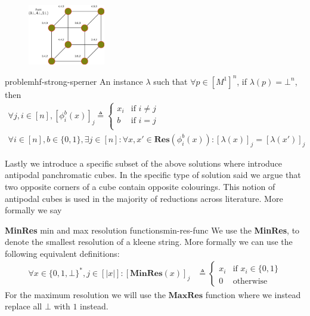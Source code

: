 \begin{figure}[h!]
    \centering
    \includegraphics[width=0.3\textwidth]{Chapter3/1753903956-dissertation-drawing-assets.pdf}
    \caption{}
    \label{fig:chap-3:res-hyper}
\end{figure}


\begin{definitionbox}{ problem}{hf-strong-sperner}
    An  instance $\lambda$ such that $\forall p \in [M^1]^n$, if $\lambda(p)= \bot^n$, then
    \begin{gather*}
        \forall j,i \in [n], [\phi^b_i(x)]_j \triangleq \begin{cases}
            x_i & \text{if }i \neq j \\
            b   & \text{if }i = j    \\
        \end{cases}\\
        \forall i \in [n],b \in\{0,1\},\exists j \in [n]: \forall x, x' \in \textbf{Res}(\phi^b_i(x)): [\lambda(x)]_j = [\lambda(x')]_j
    \end{gather*}
\end{definitionbox}

Lastly we introduce a specific subset of the above solutions where introduce antipodal panchromatic cubes.
In the specific type of solution said we argue that two opposite corners of a cube contain opposite colourings.
This notion of antipodal cubes is used in the majority of reductions across literature. More formally we say


\begin{definitionbox}{\textbf{MinRes} min and max resolution functions}{min-res-func}
    We use the \textbf{MinRes}, to denote the smallest resolution of a kleene string. More formally we can use the following equivalent definitions:
    \begin{align*}
        \forall x \in \{0,1,\bot\}^*, j \in [|x|]:  [\textbf{MinRes}(x)]_j
         & \triangleq \begin{cases}
                          x_i & \text{if } x_i \in \{0,1\} \\
                          0   & \text{otherwise}
                      \end{cases}
    \end{align*}
    For the maximum resolution we will use the $\textbf{MaxRes}$ function where we instead replace all $\bot$ with $1$ instead.
\end{definitionbox}

